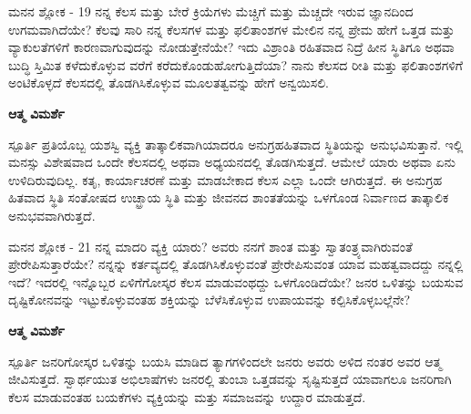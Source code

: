 
\newpage
\begin{mananam}{\mananamfont ಮನನ ಶ್ಲೋಕ - \textenglish{19}}
\footnotesize \mananamtext ನನ್ನ ಕೆಲಸ ಮತ್ತು ಬೇರೆ ಕ್ರಿಯೆಗಳು ಮೆಚ್ಚಿಗೆ ಮತ್ತು ಮೆಚ್ಚದೇ ಇರುವ ಜ್ಞಾನದಿಂದ ಉಗಮವಾಗಿದೆಯೇ? ಕೆಲವು ಸಾರಿ ನನ್ನ ಕೆಲಸಗಳ ಮತ್ತು ಫಲಿತಾಂಶಗಳ ಮೇಲಿನ ನನ್ನ ಪ್ರೇಮ ಹೇಗೆ ಒತ್ತಡ ಮತ್ತು ವ್ಯಾಕುಲತೆಗಳಿಗೆ ಕಾರಣವಾಗುವುದನ್ನು ನೋಡುತ್ತೇನೆಯೇ? ಇದು ವಿಶ್ರಾಂತಿ ರಹಿತವಾದ ನಿದ್ರೆ ಹೀನ ಸ್ಥಿತಿಗೂ ಅಥವಾ ಬುದ್ಧಿ ಸ್ತಿಮಿತ ಕಳೆದುಕೊಳ್ಳುವ ವರೆಗೆ ಕರೆದುಕೊಂಡುಹೋಗುತ್ತಿದೆಯಾ? ನಾನು ಕೆಲಸದ ರೀತಿ ಮತ್ತು ಫಲಿತಾಂಶಗಳಿಗೆ ಅಂಟಿಕೊಳ್ಳದೆ ಕೆಲಸದಲ್ಲಿ ತೊಡಗಿಸಿಕೊಳ್ಳುವ ಮೂಲತತ್ವವನ್ನು ಹೇಗೆ ಅನ್ವಯಿಸಲಿ.
\end{mananam}
\WritingHand\enspace\textbf{ಆತ್ಮ ವಿಮರ್ಶೆ}\\
\begin{inspiration}{\mananamfont ಸ್ಪೂರ್ತಿ}
\footnotesize \mananamtext ಪ್ರತಿಯೊಬ್ಬ ಯಶಸ್ವಿ ವ್ಯಕ್ತಿ ತಾತ್ಕಾಲಿಕವಾಗಿಯಾದರೂ ಅನುಗ್ರಹಹಿತವಾದ ಸ್ಥಿತಿಯನ್ನು ಅನುಭವಿಸುತ್ತಾನೆ. ಇಲ್ಲಿ ಮನಸ್ಸು ವಿಶೇಷವಾದ ಒಂದೇ ಕೆಲಸದಲ್ಲಿ ಅಥವಾ ಅಧ್ಯಯನದಲ್ಲಿ ತೊಡಗಿಸುತ್ತದೆ. ಆಮೇಲೆ ಯಾರು ಅಥವಾ ಏನು ಉಳಿದಿರುವುದಿಲ್ಲ. ಕತೃ, ಕಾರ್ಯಾಚರಣೆ ಮತ್ತು ಮಾಡಬೇಕಾದ ಕೆಲಸ ಎಲ್ಲಾ ಒಂದೇ ಆಗಿರುತ್ತದೆ. ಈ ಅನುಗ್ರಹ ಹಿತವಾದ ಸ್ಥಿತಿ ಸಂತೋಷದ  ಉಚ್ಛ್ರಾಯ ಸ್ಥಿತಿ ಮತ್ತು ಜೀವನದ ಶಾಂತತೆಯನ್ನು ಒಳಗೊಂಡ ನಿರ್ವಾಣದ ತಾತ್ಕಾಲಿಕ ಅನುಭವವಾಗಿರುತ್ತದೆ.
\end{inspiration}
\newpage


\newpage
\begin{mananam}{\mananamfont ಮನನ ಶ್ಲೋಕ - \textenglish{21}}
\footnotesize \mananamtext ನನ್ನ ಮಾದರಿ ವ್ಯಕ್ತಿ ಯಾರು? ಅವರು ನನಗೆ ಶಾಂತ ಮತ್ತು ಸ್ವಾತಂತ್ರ್ಯವಾಗಿರುವಂತೆ ಪ್ರೇರೇಪಿಸುತ್ತಾರೆಯೇ? ನನ್ನನ್ನು ಕರ್ತವ್ಯದಲ್ಲಿ ತೊಡಗಿಸಿಕೊಳ್ಳುವಂತೆ ಪ್ರೇರೇಪಿಸುವಂತ ಯಾವ ಮಹತ್ವವಾದದ್ದು ನನ್ನಲ್ಲಿ ಇದೆ? ಇದರಲ್ಲಿ ಇನ್ನೊಬ್ಬರ ಏಳಿಗೆಗೋಸ್ಕರ ಕೆಲಸ ಮಾಡುವಂಥದ್ದು ಒಳಗೊಂಡಿದೆಯೇ? ಜನರ ಒಳಿತನ್ನು ಬಯಸುವ ದೃಷ್ಟಿಕೋನವನ್ನು ಇಟ್ಟುಕೊಳ್ಳುವಂತಹ ಶಕ್ತಿಯನ್ನು ಬೆಳೆಸಿಕೊಳ್ಳುವ ಉಪಾಯವನ್ನು ಕಲ್ಪಿಸಿಕೊಳ್ಳಬಲ್ಲೆನೇ?
\end{mananam}
\WritingHand\enspace\textbf{ಆತ್ಮ ವಿಮರ್ಶೆ}\\
\begin{inspiration}{\mananamfont ಸ್ಪೂರ್ತಿ}
\footnotesize \mananamtext ಜನರಿಗೋಸ್ಕರ ಒಳಿತನ್ನು ಬಯಸಿ ಮಾಡಿದ ತ್ಯಾಗಗಳಿಂದಲೇ ಜನರು ಅವರು ಅಳಿದ ನಂತರ ಅವರ ಆತ್ಮ ಜೀವಿಸುತ್ತದೆ. ಸ್ವಾರ್ಥಯುತ ಅಭಿಲಾಷೆಗಳು ಜನರಲ್ಲಿ ತುಂಬಾ ಒತ್ತಡವನ್ನು ಸೃಷ್ಟಿಸುತ್ತದೆ ಯಾವಾಗಲೂ ಜನರಿಗಾಗಿ ಕೆಲಸ ಮಾಡುವಂತಹ ಬಯಕೆಗಳು ವ್ಯಕ್ತಿಯನ್ನು ಮತ್ತು ಸಮಾಜವನ್ನು ಉದ್ದಾರ ಮಾಡುತ್ತದೆ.
\end{inspiration}
\newpage

